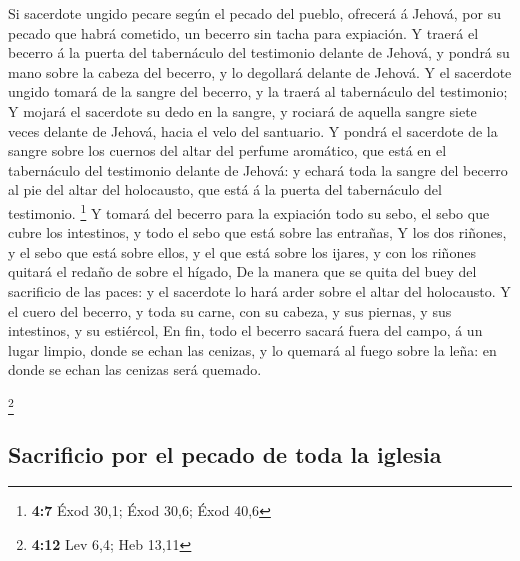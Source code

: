  Si sacerdote ungido pecare según el pecado del pueblo,
ofrecerá á Jehová, por su pecado que habrá cometido, un becerro sin
tacha para expiación.  Y traerá el becerro á la puerta del
tabernáculo del testimonio delante de Jehová, y pondrá su mano sobre la
cabeza del becerro, y lo degollará delante de Jehová.  Y
el sacerdote ungido tomará de la sangre del becerro, y la traerá al
tabernáculo del testimonio;  Y mojará el sacerdote su dedo
en la sangre, y rociará de aquella sangre siete veces delante de Jehová,
hacia el velo del santuario.  Y pondrá el sacerdote de la
sangre sobre los cuernos del altar del perfume aromático, que está en el
tabernáculo del testimonio delante de Jehová: y echará toda la sangre
del becerro al pie del altar del holocausto, que está á la puerta del
tabernáculo del testimonio. \footnote{\textbf{4:7} Éxod 30,1; Éxod 30,6;
  Éxod 40,6}  Y tomará del becerro para la expiación todo
su sebo, el sebo que cubre los intestinos, y todo el sebo que está sobre
las entrañas,  Y los dos riñones, y el sebo que está sobre
ellos, y el que está sobre los ijares, y con los riñones quitará el
redaño de sobre el hígado,  De la manera que se quita del
buey del sacrificio de las paces: y el sacerdote lo hará arder sobre el
altar del holocausto.  Y el cuero del becerro, y toda su
carne, con su cabeza, y sus piernas, y sus intestinos, y su estiércol,
 En fin, todo el becerro sacará fuera del campo, á un
lugar limpio, donde se echan las cenizas, y lo quemará al fuego sobre la
leña: en donde se echan las cenizas será quemado.

\footnote{\textbf{4:12} Lev 6,4; Heb 13,11}

\hypertarget{sacrificio-por-el-pecado-de-toda-la-iglesia}{%
\subsection{Sacrificio por el pecado de toda la
iglesia}\label{sacrificio-por-el-pecado-de-toda-la-iglesia}}


